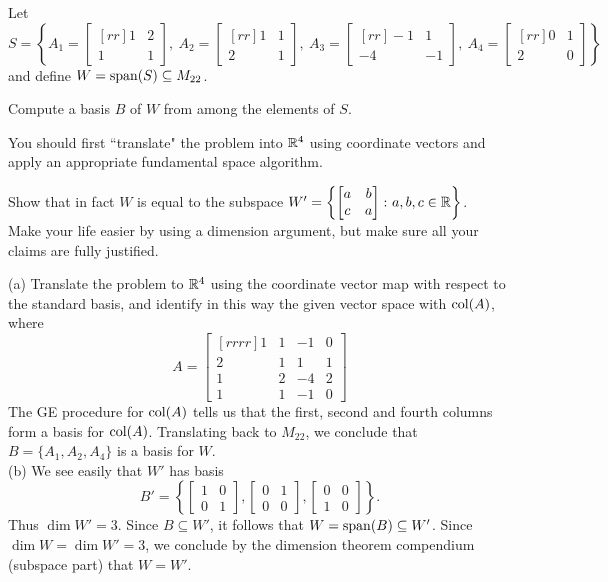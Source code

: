 \ii\label{ex:fundspace} Let 
\[
S=\left\{A_1=\begin{bmatrix}[rr]1&2\\1&1 \end{bmatrix}, \ A_2=\begin{bmatrix}[rr] 1&1\\2&1\end{bmatrix}, \ A_3=\begin{bmatrix}[rr] -1&1\\ -4&-1 \end{bmatrix} , \ A_4=\begin{bmatrix}[rr] 0&1\\2&0\end{bmatrix}\right\}
\] 
and define $W=\operatorname{span}(S)\subseteq M_{22}$. 
\bb
\item Compute a basis $B$ of $W$ from among the elements of $S$. 

You should first ``translate" the problem into ${\mathbb R}^4$ using coordinate vectors and apply an appropriate fundamental space algorithm. 
\item Show that in fact $W$ is equal to the subspace $W'=\left\{\begin{bmatrix}
a&b\\
c&a
\end{bmatrix}
\colon a,b,c\in{\mathbb R}\right\}$.
\\
Make your life easier by using a dimension argument, but make sure all your claims are fully justified. 
\ee
\begin{solution}
\noindent
(a) Translate the problem to ${\mathbb R}^4$ using the coordinate vector map with respect to the standard basis, and identify in this way the given vector space with $\operatorname{col}(A)$, where 
\[
A=\begin{bmatrix}[rrrr]
1&1&-1&0\\
2&1&1&1\\
1&2&-4&2\\
1&1&-1&0
\end{bmatrix}
\]
The GE procedure for $\operatorname{col}(A)$ tells us that the first, second and fourth columns form a basis for $\operatorname{col}(A)$. Translating back to $M_{22}$, we conclude that $B=\{A_1,A_2,A_4\}$ is a basis for $W$. 
\\
(b) We see easily that $W'$ has basis 
\[
B'=\left\{\begin{bmatrix}
1&0\\ 0&1
\end{bmatrix}, \begin{bmatrix}
0&1\\ 0&0
\end{bmatrix}, \begin{bmatrix}
0&0\\
1&0
\end{bmatrix}\right\}.
\] Thus  $\dim W'=3$. Since $B\subseteq W'$, it follows that $W=\operatorname{span}(B)\subseteq W'$. Since $\dim W=\dim W'=3$, we conclude by the dimension theorem compendium (subspace part) that $W=W'$. 

\end{solution}


\ee
